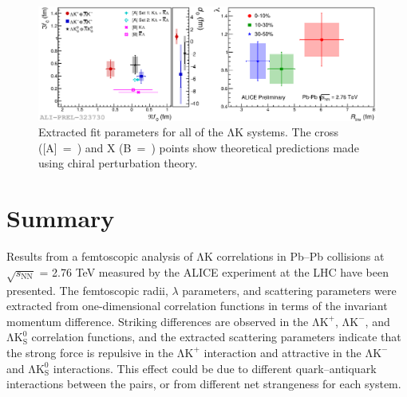 \documentclass{svproc}
\newcommand{\LamK}{$\mathrm{\Lambda}\mathrm{K}$\xspace}
\newcommand{\LamKchP}{$\mathrm{\Lambda}\mathrm{K^{+}}$\xspace}
\newcommand{\LamKchM}{$\mathrm{\Lambda}\mathrm{K^{-}}$\xspace}
\newcommand{\LamKs}{$\mathrm{\Lambda}\mathrm{K^{0}_{S}}$\xspace}
\begin{document}
\begin{figure}[h]
  \centering
  \includegraphics[width=\textwidth]{./2019-06-11-FinalResults_Comp3An.eps}
  \caption[Extracted Scattering Parameters]
  {
  Extracted fit parameters for all of the \LamK systems.  
  The cross ([A]~=~\cite{Liu:2006xja}) and X (B~=~\cite{Mai:2009ce}) points show theoretical predictions made using chiral perturbation theory.
  }
  \label{fig:ScattParams_3Res}
\end{figure}





\section{Summary}
\label{sec:Summary}
Results from a femtoscopic analysis of \LamK correlations in Pb--Pb collisions at $\sqrt{s_{\mathrm{NN}}}$ = 2.76 TeV measured by the ALICE experiment at the LHC have been presented.
The femtoscopic radii, $\lambda$ parameters, and scattering parameters were extracted from one-dimensional correlation functions in terms of the invariant momentum difference.
Striking differences are observed in the \LamKchP, \LamKchM, and \LamKs correlation functions, and the extracted scattering parameters indicate that the strong force is repulsive in the \LamKchP interaction and attractive in the \LamKchM and \LamKs interactions.
This effect could be due to different quark--antiquark interactions between the pairs, or from different net strangeness for each system. 



\newpage
\appendix
%
\renewcommand{\thesubfigure}{\thefigure(\alph{subfigure})}
\makeatletter
\renewcommand{\p@subfigure}{}
\renewcommand{\@thesubfigure}{(\alph{subfigure})\hskip\subfiglabelskip}
%


\end{document}
